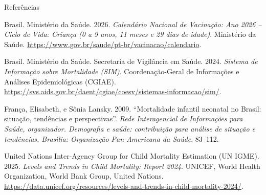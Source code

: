 \documentclass[
  ignorenonframetext,
  brazilian,
]{beamer}
\newlength{\cslhangindent}
\newenvironment{CSLReferences}[2] %
 {\begin{list}{}{%
  \setlength{\itemindent}{0pt}
  \setlength{\leftmargin}{0pt}
  \setlength{\parsep}{0pt}
  \ifodd #1
   \setlength{\leftmargin}{\cslhangindent}
   \setlength{\itemindent}{-1\cslhangindent}
  \fi
  \setlength{\itemsep}{#2\baselineskip}}}
 {\end{list}}
\begin{document}
\begin{frame}{Referências}
\protect{}\label{referuxeancias}
\protect{}\label{refs}
\begin{CSLReferences}{1}{1}
Brasil. Ministério da Saúde. 2026. \emph{Calendário Nacional de
Vacinação: Ano 2026 -- Ciclo de Vida: Criança (0 a 9 anos, 11 meses e 29
dias de idade)}. Ministério da Saúde.
\url{https://www.gov.br/saude/pt-br/vacinacao/calendario}.

Brasil. Ministério da Saúde. Secretaria de Vigilância em Saúde. 2024.
\emph{Sistema de Informa{ç}{ã}o sobre Mortalidade ({SIM})}.
Coordena{ç}{ã}o-Geral de Informa{ç}{õ}es e An{á}lises Epidemiol{ó}gicas
({CGIAE}).
\url{https://svs.aids.gov.br/daent/cgiae/coesv/sistemas-informacao/sim/}.

França, Elisabeth, e Sônia Lansky. 2009. {``Mortalidade infantil
neonatal no Brasil: situa{ç}{ã}o, tend{ê}ncias e perspectivas''}.
\emph{Rede Interagencial de Informa{ç}{õ}es para Sa{ú}de, organizador.
Demografia e sa{ú}de: contribui{ç}{ã}o para an{á}lise de situa{ç}{ã}o e
tend{ê}ncias. Bras{ı́}lia: Organiza{ç}{ã}o Pan-Americana da Sa{ú}de},
83--112.

United Nations Inter-Agency Group for Child Mortality Estimation (UN
IGME). 2025. \emph{Levels and Trends in Child Mortality: Report 2024}.
UNICEF, World Health Organization, World Bank Group, United Nations.
\url{https://data.unicef.org/resources/levels-and-trends-in-child-mortality-2024/}.

\end{CSLReferences}
\end{frame}
\end{document}

